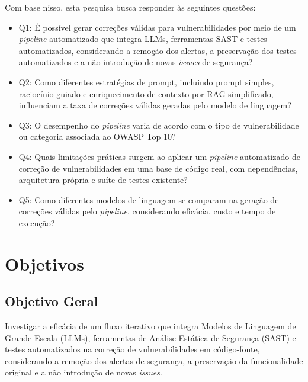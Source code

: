 Com base nisso, esta pesquisa busca responder às seguintes questões:
\begin{itemize}
 \item Q1: É possível gerar correções válidas para vulnerabilidades por meio de um \textit{pipeline} automatizado que integra LLMs, ferramentas SAST e testes automatizados, considerando a remoção dos alertas, a preservação dos testes automatizados e a não introdução de novas \textit{issues} de segurança?
 \item Q2: Como diferentes estratégias de prompt, incluindo prompt simples, raciocínio guiado e enriquecimento de contexto por RAG simplificado, influenciam a taxa de correções válidas geradas pelo modelo de linguagem?
\item Q3: O desempenho do \textit{pipeline} varia de acordo com o tipo de vulnerabilidade ou categoria associada ao OWASP Top 10?
 \item Q4: Quais limitações práticas surgem ao aplicar um \textit{pipeline} automatizado de correção de vulnerabilidades em uma base de código real, com dependências, arquitetura própria e suíte de testes existente?
 \item Q5: Como diferentes modelos de linguagem se comparam na geração de correções válidas pelo \textit{pipeline}, considerando eficácia, custo e tempo de execução?
\end{itemize}

\section{Objetivos}
\subsection{Objetivo Geral}

Investigar a eficácia de um fluxo iterativo que integra Modelos de Linguagem de Grande Escala (LLMs), ferramentas de Análise Estática de Segurança (SAST) e testes automatizados na correção de vulnerabilidades em código-fonte, considerando a remoção dos alertas de segurança, a preservação da funcionalidade original e a não introdução de novas \textit{issues}.


